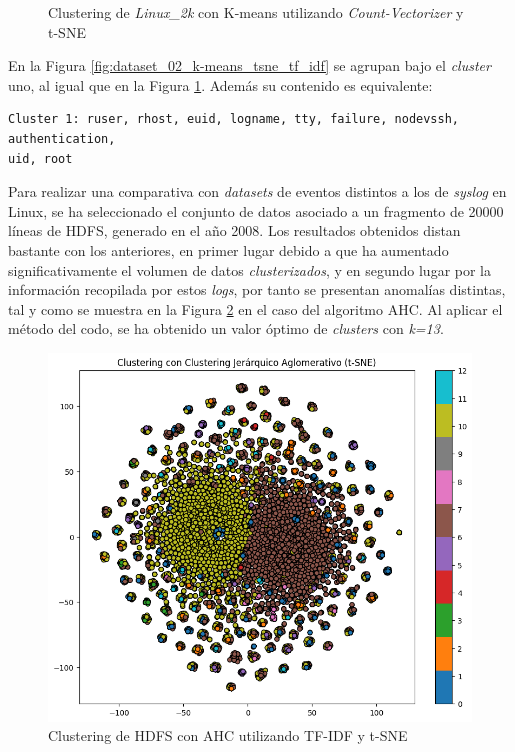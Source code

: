 \begin{figure}[H]
\begin{minipage}{0.4\textwidth}
        \caption{Clustering de \textit{Linux\_2k} con K-means utilizando \textit{Count-Vectorizer} y \gls{t-SNE}}
        \label{fig:dataset_02_k-means_tsne_count_vectorizer}
    \end{minipage}
\end{figure}

En la Figura \ref{fig:dataset_02_k-means_tsne_tf_idf} se agrupan bajo el \textit{cluster} uno, al igual que en la Figura \ref{fig:dataset_02_k-means_tsne_count_vectorizer}. Además su contenido es equivalente:

\begin{mdframed}
\scriptsize
\begin{verbatim}
Cluster 1: ruser, rhost, euid, logname, tty, failure, nodevssh, authentication, 
uid, root
\end{verbatim}
\end{mdframed}

Para realizar una comparativa con \textit{datasets} de eventos distintos a los de \textit{syslog} en Linux, se ha seleccionado el conjunto de datos asociado a un fragmento de 20000 líneas de \gls{HDFS}, generado en el año 2008. Los resultados obtenidos distan bastante con los anteriores, en primer lugar debido a que ha aumentado significativamente el volumen de datos \textit{clusterizados}, y en segundo lugar por la información recopilada por estos \textit{logs}, por tanto se presentan anomalías distintas, tal y como se muestra en la Figura \ref{fig:hdfs-ahc-t-sne} en el caso del algoritmo \gls{AHC}. Al aplicar el método del codo, se ha obtenido un valor óptimo de \textit{clusters} con \textit{k=13}.

\begin{figure}[H]
    \centering
    \includegraphics[width=0.8\linewidth]{imagenes/dataset_03_AHC_tf_idf.png}
    \caption{Clustering de \gls{HDFS} con \gls{AHC} utilizando \gls{TF}-\gls{IDF} y \gls{t-SNE}}
    \label{fig:hdfs-ahc-t-sne}
\end{figure}

